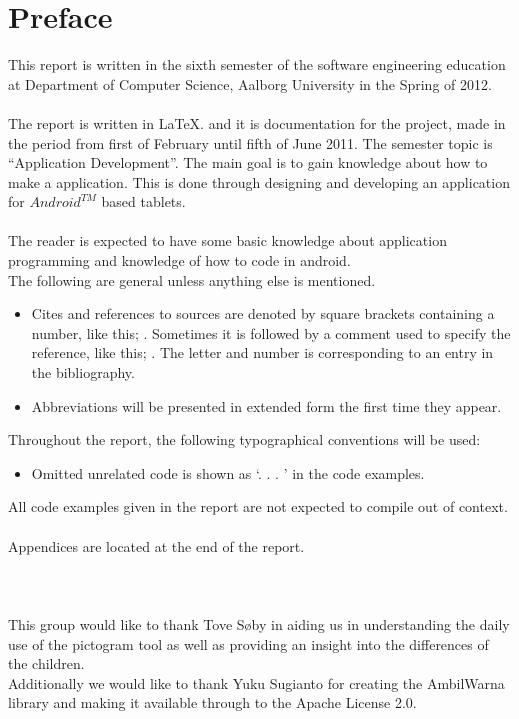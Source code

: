 \chapter*{Preface}
This report is written in the sixth semester of the software engineering education at Department of Computer Science, Aalborg University in the Spring of 2012.  \\
\\
The report is written in \LaTeX. and it is documentation for the project, made in the period from first of February until fifth of June 2011.
The semester topic is ``Application Development''. The main goal is to gain knowledge about how to make a application. This is done through designing and developing an application for $Android^{TM}$ based tablets.\\
\\
The reader is expected to have some basic knowledge about application programming and knowledge of how to code in android. \\
The following are general unless anything else is mentioned.

\begin{itemize}
\item Cites and references to sources are denoted by square brackets containing a number,  like this; \cite{XP}. Sometimes it is followed by a comment used to specify the reference, like this; \cite[Comment]{XP}. The letter and number is corresponding to an entry in the bibliography. 
\item Abbreviations will be presented in extended form the first time they appear. 
\end{itemize}

Throughout the report, the following typographical conventions will be used:
 
\begin{itemize}
\item Omitted unrelated code is shown as `. . . ’ in the code examples.
\end{itemize}

All code examples given in the report are not expected to compile out of context.\\
\\
Appendices are located at the end of the report. \\ \\  \\ \\

This group would like to thank Tove S\o{}by in aiding us in understanding the daily use of the pictogram tool as well as providing an insight into the differences of the children.\\
Additionally we would like to thank Yuku Sugianto for creating the AmbilWarna library and making it available through to the Apache License 2.0. \cite{ambilw} 


